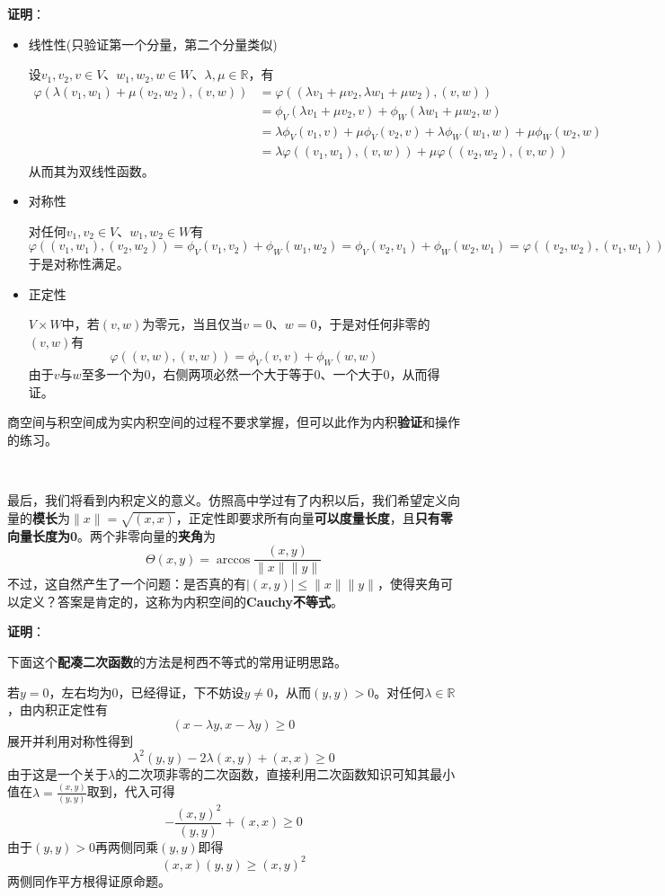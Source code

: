 \documentclass[a4paper,UTF8,fontset=windows,AutoFakeBold]{ctexart}
\newcommand*{\note}{\noindent *}
\newcommand{\proo}[1]{{\vspace{5pt}\kaishu\noindent\textbf{证明}：\vspace{-3pt}
\begin{compactitem}
    \item[] #1
\end{compactitem}
}}
\begin{document}
\proo{
    \begin{itemize}
        \item 线性性(只验证第一个分量，第二个分量类似)
        
        设$v_1,v_2,v\in V$、$w_1,w_2,w\in W$、$\lambda,\mu\in\mathbb{R}$，有
        $$\begin{aligned}\varphi(\lambda(v_1,w_1)+\mu(v_2,w_2),(v,w))&=\varphi((\lambda v_1+\mu v_2,\lambda w_1+\mu w_2),(v,w))\\ &=\phi_V(\lambda v_1+\mu v_2,v)+\phi_W(\lambda w_1+\mu w_2,w)\\ &=\lambda\phi_V(v_1,v)+\mu\phi_V(v_2,v)+\lambda\phi_W(w_1,w)+\mu\phi_W(w_2,w)\\ &=\lambda\varphi((v_1,w_1),(v,w))+\mu\varphi((v_2,w_2),(v,w))\end{aligned}$$
        从而其为双线性函数。
        
        \item 对称性
        
        对任何$v_1,v_2\in V$、$w_1,w_2\in W$有
        $$\varphi((v_1,w_1),(v_2,w_2))=\phi_V(v_1,v_2)+\phi_W(w_1,w_2)=\phi_V(v_2,v_1)+\phi_W(w_2,w_1)=\varphi((v_2,w_2),(v_1,w_1))$$
        于是对称性满足。

        
        \item 正定性
        
        $V\times W$中，若$(v,w)$为零元，当且仅当$v=0$、$w=0$，于是对任何非零的$(v,w)$有
        $$\varphi((v,w),(v,w))=\phi_V(v,v)+\phi_W(w,w)$$
        由于$v$与$w$至多一个为0，右侧两项必然一个大于等于0、一个大于0，从而得证。
    \end{itemize}
}

\note 商空间与积空间成为实内积空间的过程不要求掌握，但可以此作为内积\textbf{验证}和操作的练习。

\

最后，我们将看到内积定义的意义。仿照高中学过有了内积以后，我们希望定义向量的\textbf{模长}为$\|x\|=\sqrt{(x,x)}$，正定性即要求所有向量\textbf{可以度量长度}，且\textbf{只有零向量长度为0}。两个非零向量的\textbf{夹角}为
$$\Theta(x,y)=\arccos\frac{(x,y)}{\|x\|\|y\|}$$
不过，这自然产生了一个问题：是否真的有$|(x,y)|\le\|x\|\|y\|$，使得夹角可以定义？答案是肯定的，这称为内积空间的\textbf{Cauchy不等式}。

\proo{
    \note 下面这个\textbf{配凑二次函数}的方法是柯西不等式的常用证明思路。

    若$y=0$，左右均为0，已经得证，下不妨设$y\ne0$，从而$(y,y)>0$。对任何$\lambda\in\mathbb{R}$，由内积正定性有
    $$(x-\lambda y,x-\lambda y)\ge0$$
    展开并利用对称性得到
    $$\lambda^2(y,y)-2\lambda(x,y)+(x,x)\ge0$$
    由于这是一个关于$\lambda$的二次项非零的二次函数，直接利用二次函数知识可知其最小值在$\lambda=\frac{(x,y)}{(y,y)}$取到，代入可得
    $$-\frac{(x,y)^2}{(y,y)}+(x,x)\ge0$$
    由于$(y,y)>0$再两侧同乘$(y,y)$即得
    $$(x,x)(y,y)\ge(x,y)^2$$
    两侧同作平方根得证原命题。
}
\end{document}
